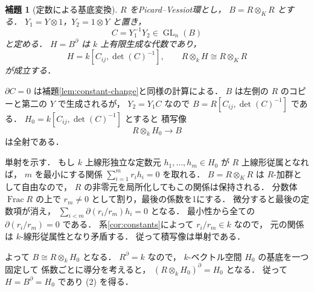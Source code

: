 \documentclass[a5paper,10pt,onecolumn]{jsarticle}
\makeatletter
\theoremstyle{mathnotetheorem}
\newtheorem{lemma}[theorem]{補題}
\renewcommand{\proofname}{証明}
\renewenvironment{proof}[1][\proofname]{%
  \par\pushQED{\qed}\normalfont\topsep4\p@\@plus2\p@\relax
  \trivlist\item[\hskip\labelsep\bfseries #1]\ignorespaces
}{\popQED\endtrivlist\@endpefalse}
\makeatother
\begin{document}
\begin{lemma}[定数による基底変換]\label{lem:torsor}
$R$ をPicard--Vessiot環とし，
$B=R\otimes_KR$ とする．
$Y_1=Y\otimes1$，$Y_2=1\otimes Y$ と置き，
\[
 C=Y_1^{-1}Y_2\in\operatorname{GL}_n(B)
\]
と定める．
$H=B^\partial$ は $k$ 上有限生成な代数であり，
\[
 H=k[C_{ij},\det(C)^{-1}],
 \qquad R\otimes_kH\cong R\otimes_KR
 \tag{2}
\]
が成立する．
\end{lemma}
\begin{proof}
$\partial C=0$ は補題\ref{lem:constant-change}と同様の計算による．
$B$ は左側の $R$ のコピーと第二の $Y$ で生成されるが，
$Y_2=Y_1C$ なので
$B=R[C_{ij},\det(C)^{-1}]$ である．
$H_0=k[C_{ij},\det(C)^{-1}]$ とすると
積写像
\[
 R\otimes_kH_0\longrightarrow B
\]
は全射である．

単射を示す．
もし $k$ 上線形独立な定数元
$h_1,\dots,h_m\in H_0$ が
$R$ 上線形従属となれば，
$m$ を最小にする関係
$\sum_{i=1}^mr_ih_i=0$ を取れる．
$B=R\otimes_KR$ は $R$-加群として自由なので，
$R$ の非零元を局所化してもこの関係は保持される．
分数体 $\operatorname{Frac}R$ の上で
$r_m\ne0$ として割り，最後の係数を1にする．
微分すると最後の定数項が消え，
$\sum_{i<m}\partial(r_i/r_m)h_i=0$ となる．
最小性から全ての $\partial(r_i/r_m)=0$ である．
系\ref{cor:constants}によって $r_i/r_m\in k$ なので，
元の関係は $k$-線形従属性となり矛盾する．
従って積写像は単射である．

よって $B\cong R\otimes_kH_0$ となる．
$R^\partial=k$ なので，
$k$-ベクトル空間 $H_0$ の基底を一つ固定して
係数ごとに導分を考えると，
$(R\otimes_kH_0)^\partial=H_0$ となる．
従って $H=B^\partial=H_0$ であり (2) を得る．
\end{proof}
\end{document}
